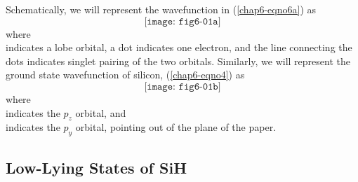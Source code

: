 Schematically, we will represent the wavefunction in
(\ref{chap6-eqno6a}) as
\begin{equation}
\texttt{[image: fig6-01a]}
\end{equation}
where 
\begin{equation}
\end{equation}
indicates a lobe orbital, a dot indicates one electron, and the line 
connecting the dots indicates singlet pairing of the two orbitals.  
Similarly, we will represent the ground state wavefunction of 
silicon, (\ref{chap6-eqno4}) as
\begin{equation}
\texttt{[image: fig6-01b]}
\label{chap6-eqno8}
\end{equation}
where
\begin{equation}
\end{equation}
indicates the $p_z$ orbital, and
\begin{equation}
\end{equation}
indicates the $p_y$ orbital, pointing out of the plane of the paper.

\subsection{Low-Lying States of SiH}

